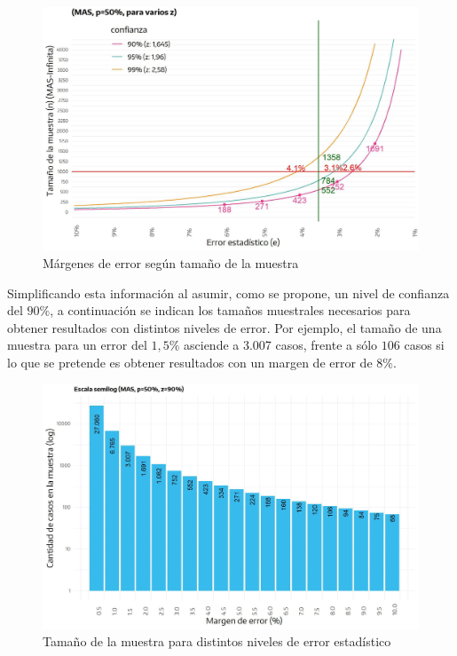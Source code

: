 \documentclass[
]{book}
\begin{document}
\begin{figure}

{\centering \includegraphics[width=1\linewidth]{imagenes/DT4_grafico2} 

}

\caption{Márgenes de error según tamaño de la muestra}\label{fig:Margenesdeerrorseguntamaño}
\end{figure}

Simplificando esta información al asumir, como se propone, un nivel de confianza del \(90\%\), a continuación se indican los tamaños muestrales necesarios para obtener resultados con distintos niveles de error. Por ejemplo, el tamaño de una muestra para un error del \(1,5\%\) asciende a 3.007 casos, frente a sólo \(106\) casos si lo que se pretende es obtener resultados con un margen de error de \(8\%\).

\begin{figure}

{\centering \includegraphics[width=1\linewidth]{imagenes/DT4_grafico3} 

}

\caption{Tamaño de la muestra para distintos niveles de error estadístico}\label{fig:Tamañodelamuestra}
\end{figure}
\end{document}
